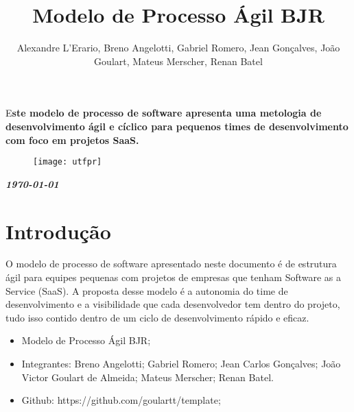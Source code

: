 \documentclass[	DIV=calc,%
							paper=a4,%
							fontsize=12pt,%
							onecolumn]{scrartcl}	 					%
\title{Modelo de Processo Ágil BJR}					%
\author{Alexandre L'Erario, Breno Angelotti, Gabriel Romero, Jean Gonçalves, João Goulart, Mateus Merscher, Renan Batel }  	%
\date{}																				%
\newcommand{\initial}[1]{%
     \lettrine[lines=3,lhang=0.3,nindent=0em]{
     				\color{DarkGoldenrod}
     				{\textsf{#1}}}{}}
\begin{document}
\maketitle
\thispagestyle{fancy} 	
\thispagestyle{empty}		%




\initial{E}\textbf{ste modelo de processo de software apresenta uma metologia de desenvolvimento ágil e cíclico para pequenos times de desenvolvimento com foco em projetos SaaS.}

\begin{figure}
	\centering
	\texttt{[image: utfpr]}
\end{figure}

\vspace{3cm}
\centerline{\textit{\textbf{\today}}}

\clearpage
    \renewcommand*\listfigurename{Lista de figuras}
\listoffigures

\renewcommand*\listtablename{Lista de tabelas}
\listoftables




\clearpage
\renewcommand{\contentsname}{Sumário}
\tableofcontents
\clearpage

\section{Introdução}
O modelo de processo de software apresentado neste documento é de estrutura ágil para equipes pequenas com projetos de empresas que tenham Software as a Service (SaaS). A proposta desse modelo é a autonomia do time de desenvolvimento e a visibilidade que cada desenvolvedor tem dentro do projeto, tudo isso contido dentro de um ciclo de desenvolvimento rápido e eficaz.

\begin{itemize}
	\item Modelo de Processo Ágil BJR;
	\item Integrantes: Breno Angelotti; Gabriel Romero; Jean Carlos Gonçalves; João Victor Goulart de Almeida; Mateus Merscher; Renan Batel.
	\item Github: https://github.com/goulartt/template;
\end{itemize}
\end{document}
